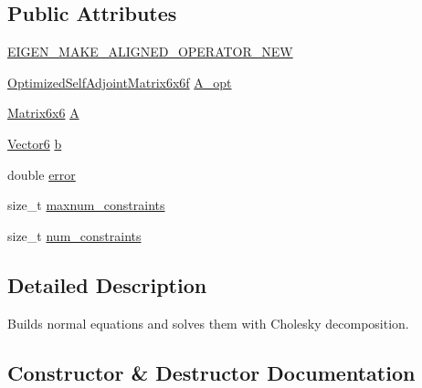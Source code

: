 \subsection*{Public Attributes}
\begin{DoxyCompactItemize}
\item 
\mbox{\hyperlink{classdvo_1_1core_1_1_normal_equations_least_squares_a6bb9257ce532f01e50ad11ac525313be}{E\+I\+G\+E\+N\+\_\+\+M\+A\+K\+E\+\_\+\+A\+L\+I\+G\+N\+E\+D\+\_\+\+O\+P\+E\+R\+A\+T\+O\+R\+\_\+\+N\+EW}}
\item 
\mbox{\hyperlink{classdvo_1_1core_1_1_optimized_self_adjoint_matrix6x6f}{Optimized\+Self\+Adjoint\+Matrix6x6f}} \mbox{\hyperlink{classdvo_1_1core_1_1_normal_equations_least_squares_aac97b94e748b2ded6104bd3edf52a8c6}{A\+\_\+opt}}
\item 
\mbox{\hyperlink{namespacedvo_1_1core_a7b76cdc563f01ec2220fd58316004626}{Matrix6x6}} \mbox{\hyperlink{classdvo_1_1core_1_1_normal_equations_least_squares_af47004a3887290742e297bc32320e98b}{A}}
\item 
\mbox{\hyperlink{namespacedvo_1_1core_a05327f3312d32a301bce9fccda9e5807}{Vector6}} \mbox{\hyperlink{classdvo_1_1core_1_1_normal_equations_least_squares_a055ee4893239c51a297340166aa4a8f4}{b}}
\item 
double \mbox{\hyperlink{classdvo_1_1core_1_1_normal_equations_least_squares_a8e147296081ecdbe25038b496d4c2130}{error}}
\item 
size\+\_\+t \mbox{\hyperlink{classdvo_1_1core_1_1_normal_equations_least_squares_a59cc5b0c4bc11f31fff1a4dfd5ad1fe7}{maxnum\+\_\+constraints}}
\item 
size\+\_\+t \mbox{\hyperlink{classdvo_1_1core_1_1_normal_equations_least_squares_a3e2e4db46014f3eefa3576b86278c9e0}{num\+\_\+constraints}}
\end{DoxyCompactItemize}


\subsection{Detailed Description}
Builds normal equations and solves them with Cholesky decomposition. 

\subsection{Constructor \& Destructor Documentation}
\mbox{\label{classdvo_1_1core_1_1_normal_equations_least_squares_a7507274ad0f440898f4eaa7c24874c81}} 
